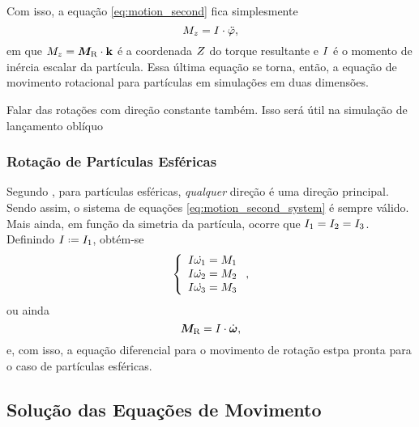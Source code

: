 Com isso, a equação \eqref{eq:motion_second} fica simplesmente
\begin{equation*}
	\torqueScalar_{z} = \momentOfInertia\cdot\deriv{2}{\orientationScalar},
\end{equation*}
em que \(M_{z} = \bm{M}_{\text{R}}\cdot\mathbf{k}\) é a coordenada \(Z\) do torque resultante e \(I\) é o momento de inércia escalar da partícula. Essa última equação se torna, então, a equação de movimento rotacional para partículas em simulações em duas dimensões.

\alert{Falar das rotações com direção constante também. Isso será útil na simulação de lançamento oblíquo}

\subsubsection{Rotação de Partículas Esféricas} \label{subsubsec:rotation_of_spherical_particles}

Segundo , para partículas esféricas, \textit{qualquer} direção é uma direção principal. Sendo assim, o sistema de equações \eqref{eq:motion_second_system} é sempre válido. Mais ainda, em função da simetria da partícula, ocorre que \(I_1 = I_2 = I_3\). Definindo \(\momentOfInertia \eqdef \momentOfInertia_1\), obtém-se
\begin{equation*}
	\left\lbrace
	\begin{array}{l}
		\momentOfInertia\deriv{1}{\angularVelocityScalar_1} = \torqueScalar_1 \\
		\momentOfInertia\deriv{1}{\angularVelocityScalar_2} = \torqueScalar_2 \\
		\momentOfInertia\deriv{1}{\angularVelocityScalar_3} = \torqueScalar_3
	\end{array}
	\right.
	,
\end{equation*}
ou ainda
\begin{equation*}
	\resultingTorque = \momentOfInertia\cdot\angularAcceleration,
\end{equation*}
e, com isso, a equação diferencial para o movimento de rotação estpa pronta para o caso de partículas esféricas.

\subsection{Solução das Equações de Movimento} \label{eq:motion_equations_solution}

